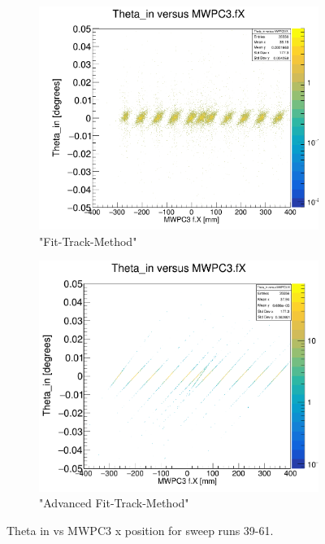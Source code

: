 \documentclass[12pt, letterpaper]{article}
\begin{document}
\begin{figure}[!htbp]
\begin{subfigure}{.5\textwidth}
  \label{fig:sub-second}
\end{subfigure}
\begin{subfigure}{.5\textwidth}
  \centering
  \includegraphics[width=.9\linewidth]{plot_imgs/theta_in_mw3_fit.png} 
  \caption{"Fit-Track-Method"}
  \label{fig:sub-second}
\end{subfigure}
\begin{subfigure}{.5\textwidth}
  \centering
  \includegraphics[width=.9\linewidth]{plot_imgs/theta_in_mw3_alpha.png} 
  \caption{"Advanced Fit-Track-Method"}
  \label{fig:sub-second}
\end{subfigure}
\caption{Theta \textunderscore in vs MWPC3 x position for sweep runs 39-61.}
\label{fig:fig}
\end{figure}
\FloatBarrier
\clearpage
\end{document}
